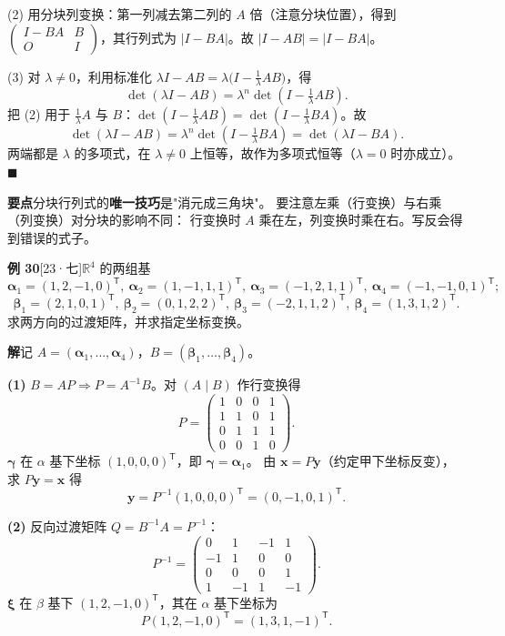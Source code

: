 \documentclass[10pt]{ctexart}
\newcommand{\Rr}{\mathbb{R}}
\newcommand{\TT}{^{\mathsf T}}
\newcommand{\bv}[1]{\begin{pmatrix}#1\end{pmatrix}}
\newcommand{\yiii}[1]{\textcolor{y23}{[23·#1]}}
\begin{document}
(2) 用分块列变换：第一列减去第二列的 $A$ 倍（注意分块位置），得到
$\begin{pmatrix}I-BA&B\\O&I\end{pmatrix}$，其行列式为 $|I-BA|$。故 $|I-AB|=|I-BA|$。

(3) 对 $\lambda\ne0$，利用标准化 $\lambda I-AB=\lambda\big(I-\tfrac1\lambda AB\big)$，得
\[
\det(\lambda I-AB)=\lambda^{n}\det\!\left(I-\tfrac1\lambda AB\right).
\]
把 (2) 用于 $\tfrac1\lambda A$ 与 $B$：$\det(I-\tfrac1\lambda AB)=\det(I-\tfrac1\lambda BA)$。故
\[
\det(\lambda I-AB)=\lambda^{n}\det\!\left(I-\tfrac1\lambda BA\right)=\det(\lambda I-BA).
\]
两端都是 $\lambda$ 的多项式，在 $\lambda\ne0$ 上恒等，故作为多项式恒等（$\lambda=0$ 时亦成立）。$\blacksquare$

\begin{tipbox}
\textbf{要点}\quad 分块行列式的\textbf{唯一技巧}是"消元成三角块"。
要注意左乘（行变换）与右乘（列变换）对分块的影响不同：
行变换时 $A$ 乘在左，列变换时乘在右。写反会得到错误的式子。
\end{tipbox}

\medskip
\textbf{例 30}\yiii{七}\quad $\Rr^4$ 的两组基
\[
\boldsymbol\alpha_1=(1,2,-1,0)\TT,\ \boldsymbol\alpha_2=(1,-1,1,1)\TT,\ \boldsymbol\alpha_3=(-1,2,1,1)\TT,\ \boldsymbol\alpha_4=(-1,-1,0,1)\TT;
\]
\[
\boldsymbol\beta_1=(2,1,0,1)\TT,\ \boldsymbol\beta_2=(0,1,2,2)\TT,\ \boldsymbol\beta_3=(-2,1,1,2)\TT,\ \boldsymbol\beta_4=(1,3,1,2)\TT .
\]
求两方向的过渡矩阵，并求指定坐标变换。

\textbf{解}\quad 记 $A=(\boldsymbol\alpha_1,\dots,\boldsymbol\alpha_4)$，$B=(\boldsymbol\beta_1,\dots,\boldsymbol\beta_4)$。

\textbf{(1)} $B=AP\Rightarrow P=A^{-1}B$。对 $(A\mid B)$ 作行变换得
\[
P=\bv{1&0&0&1\\1&1&0&1\\0&1&1&1\\0&0&1&0}.
\]
$\boldsymbol\gamma$ 在 $\alpha$ 基下坐标 $(1,0,0,0)\TT$，即 $\boldsymbol\gamma=\boldsymbol\alpha_1$。
由 $\mathbf x=P\mathbf y$（约定甲下坐标反变），求 $P\mathbf y=\mathbf x$ 得
\[
\mathbf y=P^{-1}(1,0,0,0)\TT=(0,-1,0,1)\TT .
\]

\textbf{(2)} 反向过渡矩阵 $Q=B^{-1}A=P^{-1}$：
\[
P^{-1}=\bv{0&1&-1&1\\-1&1&0&0\\0&0&0&1\\1&-1&1&-1}.
\]
$\boldsymbol\xi$ 在 $\beta$ 基下 $(1,2,-1,0)\TT$，其在 $\alpha$ 基下坐标为
\[
P(1,2,-1,0)\TT=(1,3,1,-1)\TT .
\]
\end{document}

